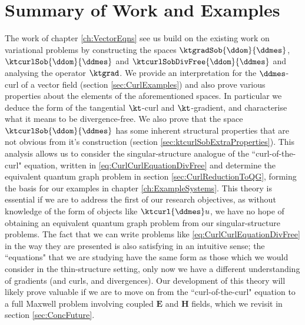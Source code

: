 \section{Summary of Work and Examples} \label{sec:ConcWork}
The work of chapter \ref{ch:VectorEqns} see us build on the existing work on variational problems by constructing the spaces $\ktgradSob{\ddom}{\ddmes}$, $\ktcurlSob{\ddom}{\ddmes}$ and $\ktcurlSobDivFree{\ddom}{\ddmes}$ and analysing the operator $\ktgrad$.
We provide an interpretation for the $\ddmes$-curl of a vector field (section \ref{sec:CurlExamples}) and also prove various properties about the elements of the aforementioned spaces.
In particular we deduce the form of the tangential $\kt$-curl and $\kt$-gradient, and characterise what it means to be divergence-free.
We also prove that the space $\ktcurlSob{\ddom}{\ddmes}$ has some inherent structural properties that are not obvious from it's construction (section \ref{sec:ktcurlSobExtraProperties}).
This analysis allows us to consider the singular-structure analogue of the ``curl-of-the-curl" equation, written in \eqref{eq:CurlCurlEquationDivFree} and determine the equivalent quantum graph problem in section \ref{sec:CurlReductionToQG}, forming the basis for our examples in chapter \ref{ch:ExampleSystems}.
This theory is essential if we are to address the first of our research objectives, as without knowledge of the form of objects like $\ktcurl{\ddmes}u$, we have no hope of obtaining an equivalent quantum graph problem from our singular-structure problems.
The fact that we can write problems like \eqref{eq:CurlCurlEquationDivFree} in the way they are presented is also satisfying in an intuitive sense; the ``equations" that we are studying have the same form as those which we would consider in the thin-structure setting, only now we have a different understanding of gradients (and curls, and divergences).
Our development of this theory will likely prove valuable if we are to move on from the ``curl-of-the-curl" equation to a full Maxwell problem involving coupled $\mathbf{E}$ and $\mathbf{H}$ fields, which we revisit in section \ref{sec:ConcFuture}. \newline

